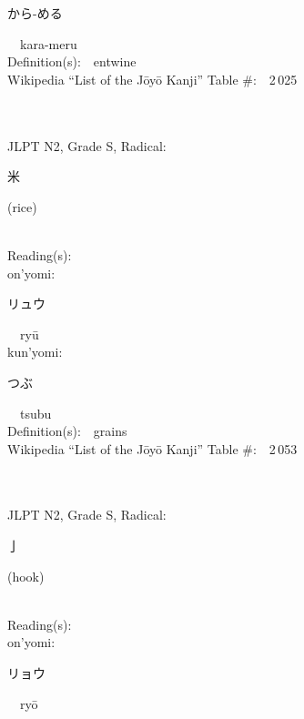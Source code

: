 \begin{multicols}{2}
{\hspace*{2em}}{\begin{CJK}{UTF8}{min} から-める \end{CJK}}\ \ kara-meru\ \ \\
Definition(s):\ \ entwine \\
Wikipedia ``List of the J\=oy\=o Kanji'' Table \#:\ \ 2\,025 \\
\ \ \\
{\fontsize{34pt}{40pt}  }\ \ \\  %
{JLPT N2, Grade S, Radical:\ \ {\begin{CJK}{UTF8}{min} 米 \end{CJK}} (rice) } \\
Reading(s):\ \ \\
{\hspace*{1em}}on'yomi:\ \ \\
{\hspace*{2em}}{\begin{CJK}{UTF8}{min} リュウ \end{CJK}}\ \ ry\=u\ \ \\
{\hspace*{1em}}kun'yomi:\ \ \\
{\hspace*{2em}}{\begin{CJK}{UTF8}{min} つぶ \end{CJK}}\ \ tsubu\ \ \\
Definition(s):\ \ grains \\
Wikipedia ``List of the J\=oy\=o Kanji'' Table \#:\ \ 2\,053 \\
\ \ \\
{\fontsize{34pt}{40pt}  }\ \ \\  %
{JLPT N2, Grade S, Radical:\ \ {\begin{CJK}{UTF8}{min} 亅 \end{CJK}} (hook) } \\
Reading(s):\ \ \\
{\hspace*{1em}}on'yomi:\ \ \\
{\hspace*{2em}}{\begin{CJK}{UTF8}{min} リョウ \end{CJK}}\ \ ry\=o\ \ \\

\end{multicols}
